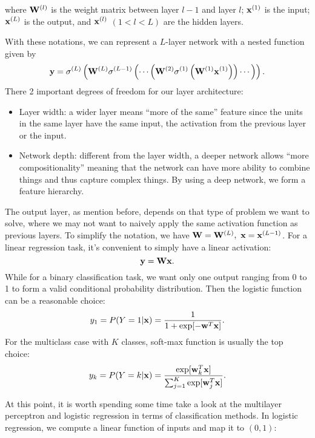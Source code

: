 \documentclass[../book-template.tex]{subfiles}
\begin{document}
where ${\bf W}^{(l)}$ is the weight matrix between layer $l-1$ and layer $l$; ${\bf x}^{(1)}$ is the input; ${\bf x}^{(L)}$ is the output, and ${\bf x}^{(l)}$ $(1<l<L)$ are the hidden layers. \par With these notations, we can represent a $L$-layer network with a nested function given by
\begin{equation*}
	{\bf y} = \sigma^{(L)}\left({\bf W}^{(L)}\sigma^{(L-1)}\left(\cdots\left({\bf W}^{(2)}\sigma^{(1)}\left({\bf W}^{(1)}{\bf x}^{(1)}\right)\right)\cdots\right)\right).
\end{equation*}
There 2 important degrees of freedom for our layer architecture:
\begin{itemize}
	\item Layer width: a wider layer means ``more of the same'' feature since the units in the same layer have the same input, the activation from the previous layer or the input.
	\item Network depth: different from the layer width, a deeper network allows ``more compositionality'' meaning that the network can have more ability to combine things and thus capture complex things. By using a deep network, we form a feature hierarchy.
\end{itemize}
\par The output layer, as mention before, depends on that type of problem we want to solve, where we may not want to naively apply the same activation function as previous layers. To simplify the notation, we have ${\bf W} = {\bf W}^{(L)},\ {\bf x}={\bf x}^{(L-1)}$. For a linear regression task, it's convenient to simply have a linear activation:
\begin{equation*}
	{\bf y}={\bf Wx}.
\end{equation*}
While for a binary classification task, we want only one output ranging from 0 to 1 to form a valid conditional probability distribution. Then the logistic function can be a reasonable choice:
\begin{equation*}
	y_1 = P(Y=1|{\bf x})=\frac{1}{1+\exp[-{\bf w}^T {\bf x}]}.
\end{equation*}
For the multiclass case with $K$ classes, soft-max function is usually the top choice:
\begin{equation*}
	y_k = P(Y=k|{\bf x})=\frac{\exp[{\bf w}_k^T {\bf x}]}{\sum_{j=1}^{K}\exp[{\bf w}_j^T {\bf x}]}.
\end{equation*}
\par At this point, it is worth spending some time take a look at the multilayer perceptron and logistic regression in terms of classification methods. In logistic regression, we compute a linear function of inputs and map it to $(0,1)$:
\end{document}
